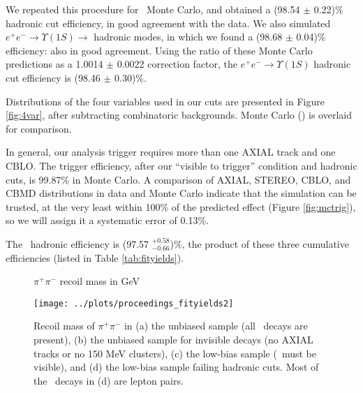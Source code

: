 \documentclass[aps,prd,preprint,superscriptaddress,tightenlines,nofootinbib,floatfix]{revtex4}
\begin{document}
We repeated this procedure for \twotoone\ Monte Carlo, and obtained a
(98.54 $\pm$ 0.22)\% hadronic cut efficiency, in good agreement with
the data.  We also simulated $e^+e^- \to \Upsilon(1S) \to$ hadronic
modes, in which we found a (98.68 $\pm$ 0.04)\% efficiency: also in
good agreement.  Using the ratio of these Monte Carlo predictions as a
1.0014 $\pm$ 0.0022 correction factor, the $e^+e^- \to \Upsilon(1S)$
hadronic cut efficiency is (98.46 $\pm$ 0.30)\%.

Distributions of the four variables used in our cuts are presented in
Figure \ref{fig:4var}, after subtracting combinatoric backgrounds.
Monte Carlo (\twotoone) is overlaid for comparison.

In general, our analysis trigger requires more than one AXIAL track
and one CBLO.  The trigger efficiency, after our ``visible to
trigger'' condition and hadronic cuts, is 99.87\% in Monte Carlo.  A
comparison of AXIAL, STEREO, CBLO, and CBMD distributions in data and
Monte Carlo indicate that the simulation can be trusted, at the very
least within 100\% of the predicted effect (Figure \ref{fig:mctrig}),
so we will assign it a systematic error of 0.13\%.

The \uone\ hadronic efficiency is (97.57 $^{+0.58}_{-0.66}$)\%, the
product of these three cumulative efficiencies (listed in Table
\ref{tab:fityields}).

\begin{figure}[p]
  \vspace{3 cm}
  \begin{center}
    \Large $\pi^+\pi^-$ recoil mass in GeV
  \end{center}

  \vspace{-1.8 cm}
  \begin{center}
    \texttt{[image: ../plots/proceedings\_fityields2]}
  \end{center}
  \caption{\label{fig:recoil} Recoil mass of $\pi^+\pi^-$ in (a) the
    unbiased sample (all \ups\ decays are present), (b) the unbiased
    sample for invisible decays (no AXIAL tracks or no 150 MeV
    clusters), (c) the low-bias sample (\ups\ must be visible), and
    (d) the low-bias sample failing hadronic cuts.  Most of the \uone\
    decays in (d) are lepton pairs.}
\end{figure}
\end{document}

